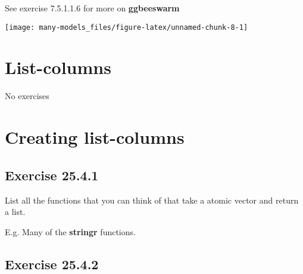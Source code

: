 \documentclass[]{book}
\newenvironment{Shaded}{\begin{snugshade}}{\end{snugshade}}
\newcommand{\DataTypeTok}[1]{\textcolor[rgb]{0.13,0.29,0.53}{#1}}
\newcommand{\KeywordTok}[1]{\textcolor[rgb]{0.13,0.29,0.53}{\textbf{#1}}}
\newcommand{\NormalTok}[1]{#1}
\newcommand{\OperatorTok}[1]{\textcolor[rgb]{0.81,0.36,0.00}{\textbf{#1}}}
\newcommand{\OtherTok}[1]{\textcolor[rgb]{0.56,0.35,0.01}{#1}}
\newcommand{\StringTok}[1]{\textcolor[rgb]{0.31,0.60,0.02}{#1}}
\theoremstyle{plain}
\theoremstyle{remark}
\begin{document}
See exercise 7.5.1.1.6 for more on \textbf{ggbeeswarm}

\begin{Shaded}
\end{Shaded}

\begin{center}\texttt{[image: many-models\_files/figure-latex/unnamed-chunk-8-1]} \end{center}

\hypertarget{list-columns}{%
\section{List-columns}\label{list-columns}}

No exercises

\hypertarget{creating-list-columns}{%
\section{Creating list-columns}\label{creating-list-columns}}

\hypertarget{exercise-25.4.1}{%
\subsection*{\texorpdfstring{Exercise
{25.4.1}}{Exercise 25.4.1}}\label{exercise-25.4.1}}

List all the functions that you can think of that take a atomic vector
and return a list.

E.g. Many of the \textbf{stringr} functions.

\hypertarget{exercise-25.4.2}{%
\subsection*{\texorpdfstring{Exercise
{25.4.2}}{Exercise 25.4.2}}\label{exercise-25.4.2}}
\end{document}
